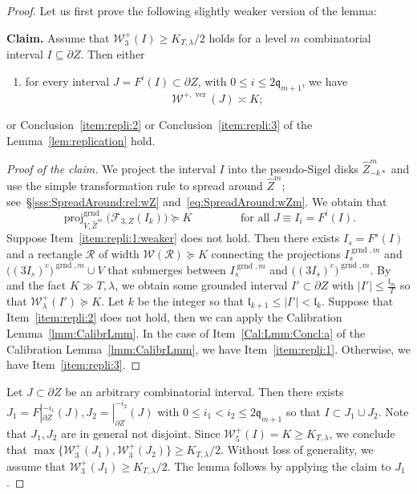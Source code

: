 \documentclass{amsart}
\newcommand{\proj}{{\operatorname{proj}}}
\newcommand{\1}{{\mathbb 1 }}
\newcommand{\Fam}{{\mathcal F}}
\newcommand{\Width}{{\mathcal W}}
\newcommand\RR{\mathcal{R}}
\newcommand{\wZ}{{\widehat Z}}
\newcommand{\qq}{\mathfrak{q}}
\newcommand{\length}{{\mathfrak l}}
\newcommand{\grnd}{{\operatorname{grnd}}}
\newcommand\ver{{\operatorname{ver}}}
\theoremstyle{remark}
\numberwithin{equation}{section}
\theoremstyle{definition}
\begin{document}
\begin{proof} Let us first prove the following slightly weaker version of the lemma:
\vspace{0.2cm}

{\bf  Claim.} Assume that $\Width_3^+(I)\ge K_{T,\lambda}/2$ holds for a level $m$ combinatorial interval $I \subseteq \partial Z$. Then either
   \begin{enumerate}[label=\text{(\roman*')},font=\normalfont,leftmargin=*]
        \item\label{item:repli:1:weaker} for every  interval $J = F^i(I) \subset \partial Z$, with $0 \leq i \leq 2\qq_{m+1}$, we have
        $$
        \Width^{+, \ver}(J) \asymp K;
        $$    
\end{enumerate}
or Conclusion~\ref{item:repli:2} or Conclusion~\ref{item:repli:3} of the Lemma~\ref{lem:replication} hold.
    \begin{proof}[Proof of the claim]
     We project the interval $I$ into the pseudo-Sigel disks $\wZ^m_{-k*}$ and use the simple transformation rule to spread around $\wZ^m$; see~\S\ref{sss:SpreadAround:rel:wZ} and~\eqref{eq:SpreadAround:wZm}. We obtain that \[\proj^\grnd_{V,\wZ^m} \big(\Fam_{3, Z}(I_k)\big)\succeq K\qquad\qquad \text{ for all }J\equiv I_i=F^i(I).\]   Suppose Item~\ref{item:repli:1:weaker} does not hold. Then there exists $I_s = F^s(I)$ and a rectangle $\RR$ of width $\Width(\RR) \succeq K$ connecting the projections $I^{\grnd, m}_s$ and $\big((3 I_s)^c\big)^{\grnd, m}\cup V$ that submerges between $I^{\grnd, m}_s$ and $\big((3 I_s)^c\big)^{\grnd, m}$. By \cite[Snake Lemma 6.1]{DL22} and the fact $K \gg T, \lambda$, we obtain some grounded interval $I'\subset \partial Z$ with $|I'| \leq \frac{\length_m}{T}$ so that $\Width^+_\lambda(I') \succeq K$. Let $k$ be the integer so that $\length_{k+1} \leq |I'| < \length_k$. Suppose that Item~\ref{item:repli:2} does not hold, then we can apply the Calibration Lemma~\ref{lmm:CalibrLmm}. In the case of Item~\ref{Cal:Lmm:Concl:a} of the Calibration Lemma~\ref{lmm:CalibrLmm}, we have Item~\ref{item:repli:1}. Otherwise, we have Item~\ref{item:repli:3}.
    \end{proof}
   Let $J \subset \partial Z$ be an arbitrary combinatorial interval. Then there exists $J_1 = F|_{\partial Z}^{-i_1}(J), J_2 = |_{\partial Z}^{-i_2}(J)$ with $0\leq i_1< i_2 \leq 2 \qq_{m+1}$ so that $I \subset J_1 \cup J_2$. Note that $J_1, J_2$ are in general not disjoint. Since $\Width^{+}_5(I) = K \geq K_{T, \lambda}$, we conclude that $\max\{\Width^{+}_3(J_1), \Width^{+}_3(J_2)\} \geq K_{T, \lambda}/2$. Without loss of generality, we assume that $\Width^{+}_3(J_1) \geq K_{T, \lambda}/2$. The lemma follows by applying the claim to $J_1$. 
\end{proof}
\end{document}
